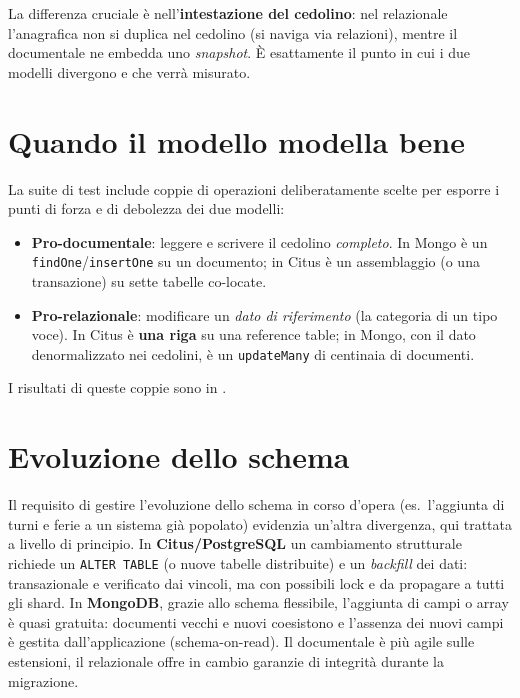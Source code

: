 La differenza cruciale è nell'\textbf{intestazione del cedolino}: nel relazionale l'anagrafica non si duplica
nel cedolino (si naviga via relazioni), mentre il documentale ne embedda uno \emph{snapshot}. È esattamente
il punto in cui i due modelli divergono e che verrà misurato.

\section{Quando il modello modella bene}
\label{sec:contrasto-modelli}

La suite di test include coppie di operazioni deliberatamente scelte per esporre i punti di forza e di
debolezza dei due modelli:
\begin{itemize}
  \item \textbf{Pro-documentale}: leggere e scrivere il cedolino \emph{completo}. In Mongo è un
        \texttt{findOne}/\texttt{insertOne} su un documento; in Citus è un assemblaggio (o una transazione)
        su sette tabelle co-locate.
  \item \textbf{Pro-relazionale}: modificare un \emph{dato di riferimento} (la categoria di un tipo voce). In
        Citus è \textbf{una riga} su una reference table; in Mongo, con il dato denormalizzato nei cedolini, è
        un \texttt{updateMany} di centinaia di documenti.
\end{itemize}
I risultati di queste coppie sono in .

\section{Evoluzione dello schema}
\label{sec:evoluzione}

Il requisito di gestire l'evoluzione dello schema in corso d'opera (es.\ l'aggiunta di turni e ferie a un
sistema già popolato) evidenzia un'altra divergenza, qui trattata a livello di principio. In
\textbf{Citus/PostgreSQL} un cambiamento strutturale richiede un \texttt{ALTER TABLE} (o nuove tabelle
distribuite) e un \emph{backfill} dei dati: transazionale e verificato dai vincoli, ma con possibili lock e da
propagare a tutti gli shard. In \textbf{MongoDB}, grazie allo schema flessibile, l'aggiunta di campi o array
è quasi gratuita: documenti vecchi e nuovi coesistono e l'assenza dei nuovi campi è gestita dall'applicazione
(schema-on-read). Il documentale è più agile sulle estensioni, il relazionale offre in cambio garanzie di
integrità durante la migrazione.

